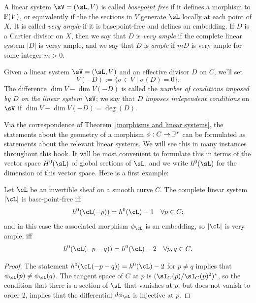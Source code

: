 A linear system $\sV = (\sL, V)$ is called \emph{basepoint free} if it defines a morphism to $\PP(V)$, or equivalently if the
the sections in $V$ generate $\sL$ locally at each point of $X$. It is called \emph{very ample}  if it is basepoint-free and defines an embedding. If $D$ is a Cartier divisor on $X$, then we say that $D$ is \emph{very ample} if the complete linear system $|D|$ is versy ample, and we say that $D$ is \emph{ample} if $mD$ is very ample for some integer $m>0$.

Given a linear system $\sV = (\sL, V)$ and an effective divisor $D$ on $C$, we'll  set
$$
V(-D) := \{ \sigma \in V \mid \sigma(D) = 0 \}.
$$
The difference $\dim V - \dim V(-D)$ is called the \emph{number of conditions imposed by $D$ on the linear system $\sV$}; we say that $D$ \emph{imposes independent conditions} on $\sV$ if $\dim V - \dim V(-D) = \deg(D)$.


Via the correspondence of Theorem~\ref{morphisms and linear systems}, the statements about the geometry of a morphism $\phi : C \to \PP^r$ can be formulated as statements about the relevant linear systems. We will see this in many instances throughout this book. It will be most convenient to formulate this in terms of the vector space $H^{0}(\sL)$ of global sections of $\sL$, and we write $h^{0}(\sL)$ for the dimension of this vector space. Here is a first example:

\begin{proposition}\label{very ample}\cite[Thm. IV.3.1]{H}
Let $\cL$ be an invertible sheaf on a smooth curve $C$. The complete linear system $|\cL|$ is base-point-free iff
$$
h^0(\cL(-p)) = h^0(\cL) - 1 \quad \forall p \in C;
$$
and in this case the associated morphism $\phi_\cL$ is an embedding, so $|\cL|$ is very ample, iff
$$
h^0(\cL(-p-q)) = h^0(\cL) - 2 \quad \forall p, q \in C.
$$
\end{proposition} 

\begin{proof}
The statement $h^0(\cL(-p-q)) = h^0(\cL) - 2$ for $p \neq q$ implies that $\phi_\cL(p) \neq \phi_\cL(q)$. The tangent space of $C$ at $p$ is $(\sI_C(p)/\sI_C(p)^2)^*$, so the condition that there is a section of $\sL$ that vanishes at $p$, but does not vanish
to order 2, implies that the differential $d\phi_\cL$ is injective at $p$.
\end{proof}


